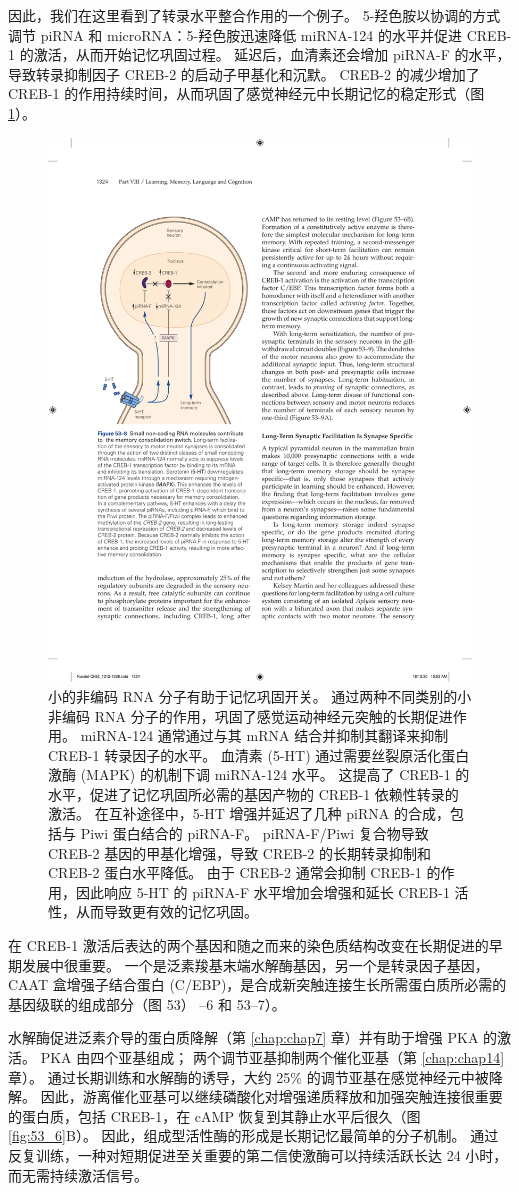 因此，我们在这里看到了转录水平整合作用的一个例子。 5-羟色胺以协调的方式调节 piRNA 和 microRNA：5-羟色胺迅速降低 miRNA-124 的水平并促进 CREB-1 的激活，从而开始记忆巩固过程。
延迟后，血清素还会增加 piRNA-F 的水平，导致转录抑制因子 CREB-2 的启动子甲基化和沉默。
CREB-2 的减少增加了 CREB-1 的作用持续时间，从而巩固了感觉神经元中长期记忆的稳定形式（图 \ref{fig:53_8}）。


\begin{figure}[htbp]
	\centering
	\includegraphics[width=0.5\linewidth]{chap53/fig_53_8}
	\caption{小的非编码 RNA 分子有助于记忆巩固开关。 通过两种不同类别的小非编码 RNA 分子的作用，巩固了感觉运动神经元突触的长期促进作用。 miRNA-124 通常通过与其 mRNA 结合并抑制其翻译来抑制 CREB-1 转录因子的水平。 血清素 (5-HT) 通过需要丝裂原活化蛋白激酶 (MAPK) 的机制下调 miRNA-124 水平。 这提高了 CREB-1 的水平，促进了记忆巩固所必需的基因产物的 CREB-1 依赖性转录的激活。 在互补途径中，5-HT 增强并延迟了几种 piRNA 的合成，包括与 Piwi 蛋白结合的 piRNA-F。 piRNA-F/Piwi 复合物导致 CREB-2 基因的甲基化增强，导致 CREB-2 的长期转录抑制和 CREB-2 蛋白水平降低。 由于 CREB-2 通常会抑制 CREB-1 的作用，因此响应 5-HT 的 piRNA-F 水平增加会增强和延长 CREB-1 活性，从而导致更有效的记忆巩固。}
	\label{fig:53_8}
\end{figure}


在 CREB-1 激活后表达的两个基因和随之而来的染色质结构改变在长期促进的早期发展中很重要。
一个是泛素羧基末端水解酶基因，另一个是转录因子基因，CAAT 盒增强子结合蛋白 (C/EBP)，是合成新突触连接生长所需蛋白质所必需的基因级联的组成部分（图 53） –6 和 53–7）。


水解酶促进泛素介导的蛋白质降解（第 \ref{chap:chap7} 章）并有助于增强 PKA 的激活。
PKA 由四个亚基组成； 两个调节亚基抑制两个催化亚基（第 \ref{chap:chap14} 章）。
通过长期训练和水解酶的诱导，大约 25\% 的调节亚基在感觉神经元中被降解。
因此，游离催化亚基可以继续磷酸化对增强递质释放和加强突触连接很重要的蛋白质，包括 CREB-1，在 cAMP 恢复到其静止水平后很久（图 \ref{fig:53_6}B）。
因此，组成型活性酶的形成是长期记忆最简单的分子机制。
通过反复训练，一种对短期促进至关重要的第二信使激酶可以持续活跃长达 24 小时，而无需持续激活信号。


